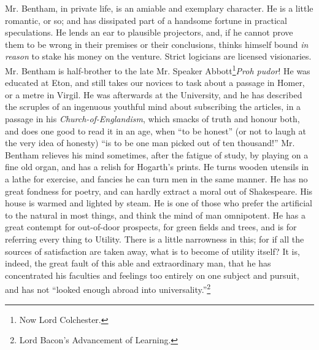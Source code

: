 Mr. Bentham, in private life, is an amiable and exemplary
character.  He is a little romantic, or so; and has dissipated
part of a handsome fortune in practical speculations. He lends an
ear to plausible projectors, and, if he cannot prove them to be
wrong in their premises or their conclusions, thinks himself bound
\emph{in reason} to stake his money on the venture. Strict
logicians are licensed visionaries. Mr.  Bentham is half-brother
to the late Mr. Speaker Abbott\footnote{Now Lord
  Colchester.}\textemdash\emph{Proh pudor}!  He was educated at
Eton, and still takes our novices to task about a passage in
Homer, or a metre in Virgil. He was afterwards at the University,
and he has described the scruples of an ingenuous youthful mind
about subscribing the articles, in a passage in his
\emph{Church-of-Englandism}, which smacks of truth and honour
both, and does one good to read it in an age, when ``to be
honest'' (or not to laugh at the very idea of honesty) ``is to be
one man picked out of ten thousand!''  Mr. Bentham relieves his
mind sometimes, after the fatigue of study, by playing on a fine
old organ, and has a relish for Hogarth's prints. He turns wooden
utensils in a lathe for exercise, and fancies he can turn men in
the same manner. He has no great fondness for poetry, and can
hardly extract a moral out of Shakespeare. His house is warmed and
lighted by steam. He is one of those who prefer the artificial to
the natural in most things, and think the mind of man
omnipotent. He has a great contempt for out-of-door prospects, for
green fields and trees, and is for referring every thing to
Utility. There is a little narrowness in this; for if all the
sources of satisfaction are taken away, what is to become of
utility itself? It is, indeed, the great fault of this able and
extraordinary man, that he has concentrated his faculties and
feelings too entirely on one subject and pursuit, and has not
``looked enough abroad into universality.''\footnote{Lord Bacon's
  Advancement of Learning.}


